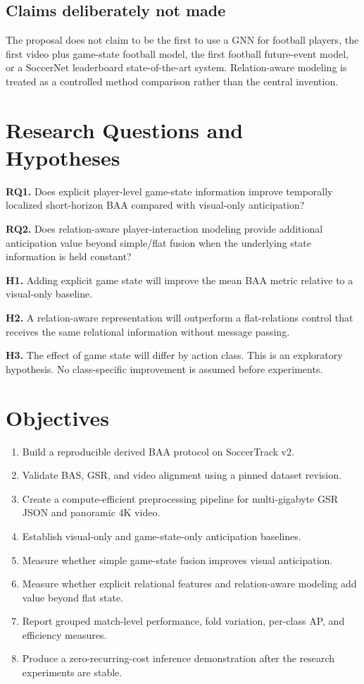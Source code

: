 \documentclass[11pt,a4paper]{article}
\begin{document}
\subsection{Claims deliberately not made}
The proposal does not claim to be the first to use a GNN for football players, the first video plus game-state football model, the first football future-event model, or a SoccerNet leaderboard state-of-the-art system. Relation-aware modeling is treated as a controlled method comparison rather than the central invention.

\section{Research Questions and Hypotheses}
\textbf{RQ1.} Does explicit player-level game-state information improve temporally localized short-horizon BAA compared with visual-only anticipation?

\textbf{RQ2.} Does relation-aware player-interaction modeling provide additional anticipation value beyond simple/flat fusion when the underlying state information is held constant?

\textbf{H1.} Adding explicit game state will improve the mean BAA metric relative to a visual-only baseline.

\textbf{H2.} A relation-aware representation will outperform a flat-relations control that receives the same relational information without message passing.

\textbf{H3.} The effect of game state will differ by action class. This is an exploratory hypothesis. No class-specific improvement is assumed before experiments.

\section{Objectives}
\begin{enumerate}
  \item Build a reproducible derived BAA protocol on SoccerTrack v2.
  \item Validate BAS, GSR, and video alignment using a pinned dataset revision.
  \item Create a compute-efficient preprocessing pipeline for multi-gigabyte GSR JSON and panoramic 4K video.
  \item Establish visual-only and game-state-only anticipation baselines.
  \item Measure whether simple game-state fusion improves visual anticipation.
  \item Measure whether explicit relational features and relation-aware modeling add value beyond flat state.
  \item Report grouped match-level performance, fold variation, per-class AP, and efficiency measures.
  \item Produce a zero-recurring-cost inference demonstration after the research experiments are stable.
\end{enumerate}
\end{document}
